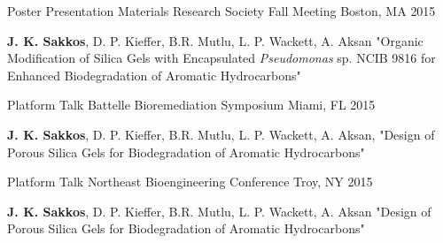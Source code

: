 \begin{cventries}
\cventry
{Poster Presentation}
{Materials Research Society Fall Meeting}
{Boston, MA} %
{2015} %
{ %
	\begin{cvitems}
		\item {\textbf{J. K. Sakkos}, D. P. Kieffer, B.R. Mutlu, L. P. Wackett, A. Aksan "Organic Modification of Silica Gels with Encapsulated \textit{Pseudomonas} sp. NCIB 9816 for Enhanced Biodegradation of Aromatic Hydrocarbons"}
	\end{cvitems}
}

\cventry
{Platform Talk}
{Battelle Bioremediation Symposium}
{Miami, FL} %
{2015} %
{ %
	\begin{cvitems}
		\item {\textbf{J. K. Sakkos}, D. P. Kieffer, B.R. Mutlu, L. P. Wackett, A. Aksan, "Design of Porous Silica Gels for Biodegradation of Aromatic Hydrocarbons"}
	\end{cvitems}
}

\cventry
{Platform Talk}
{Northeast Bioengineering Conference}
{Troy, NY} %
{2015} %
{ %
	\begin{cvitems}
		\item {\textbf{J. K. Sakkos}, D. P. Kieffer, B.R. Mutlu, L. P. Wackett, A. Aksan "Design of Porous Silica Gels for Biodegradation of Aromatic Hydrocarbons"}
	\end{cvitems}
}


\end{cventries}